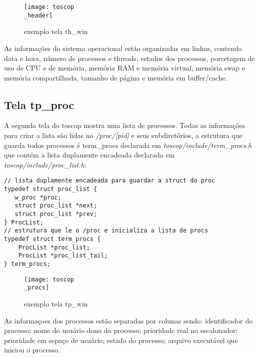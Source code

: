 \documentclass{article}
\begin{document}
\begin{figure}[hb]
    \centering
    \texttt{[image: toscop\\\_header]}
    \caption{exemplo tela th\_win}
\end{figure}
As informações do sistema operacional estão organizadas em linhas, 
contendo data e hora, número de processos e threads, estados dos processos, 
porcetagem de uso de CPU e de memória, memória RAM e memória virtual,
memória swap e memória compartilhada, tamanho de página e memória em buffer/cache.

\subsection{Tela tp\_proc}
A segunda tela do toscop mostra uma lista de processos. Todas as 
informações para criar a lista são lidas no \textit{/proc/[pid]} e seus
subdiretórios, a estrutura que guarda todos processos é term\_procs declarada
em \textit{toscop/include/term\_procs.h} que contém a lista duplamente
encadeada declarada em \textit{toscop/include/proc\_list.h}:
\begin{verbatim}
// lista duplamente encadeada para guardar a struct do proc
typedef struct proc_list {
   w_proc *proc;
   struct proc_list *next;
   struct proc_list *prev;
} ProcList;
// estrutura que le o /proc e inicializa a lista de procs
typedef struct term_procs {
    ProcList *proc_list;
    ProcList *proc_list_tail;
} term_procs;
\end{verbatim}
\begin{figure}[hb]
    \centering
    \texttt{[image: toscop\\\_procs]}
    \caption{exemplo tela tp\_win}
\end{figure}
As informaçoes dos processos estão separadas por colunas sendo:
identificador do processo; nome do usuário dono do processo;
prioridade real no escalonador; prioridade em espaço de usuário;
estado do processo; arquivo executável que iniciou o processo.
\end{document}
